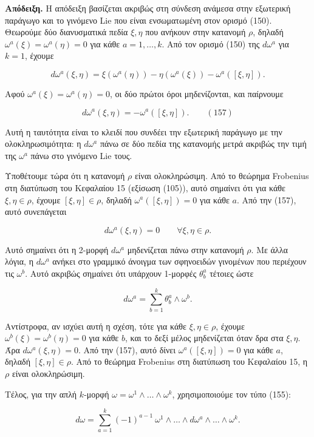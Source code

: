 \documentclass[12pt]{article}
\begin{document}
\textbf{Απόδειξη.} Η απόδειξη βασίζεται ακριβώς στη σύνδεση ανάμεσα στην εξωτερική παράγωγο και το γινόμενο Lie που είναι ενσωματωμένη στον ορισμό (150). Θεωρούμε δύο διανυσματικά πεδία $\xi, \eta$ που ανήκουν στην κατανομή $\rho$, δηλαδή $\omega^a(\xi) = \omega^a(\eta) = 0$ για κάθε $a = 1, \dots, k$. Από τον ορισμό (150) της $d\omega^a$ για $k=1$, έχουμε

\[
d\omega^a(\xi, \eta) = \xi(\omega^a(\eta)) - \eta(\omega^a(\xi)) - \omega^a([\xi, \eta]).
\]

Αφού $\omega^a(\xi) = \omega^a(\eta) = 0$, οι δύο πρώτοι όροι μηδενίζονται, και παίρνουμε

\[
d\omega^a(\xi, \eta) = -\omega^a([\xi, \eta]). \qquad (157)
\]

Αυτή η ταυτότητα είναι το κλειδί που συνδέει την εξωτερική παράγωγο με την ολοκληρωσιμότητα: η $d\omega^a$ πάνω σε δύο πεδία της κατανομής μετρά ακριβώς την τιμή της $\omega^a$ πάνω στο γινόμενο Lie τους.

Υποθέτουμε τώρα ότι η κατανομή $\rho$ είναι ολοκληρώσιμη. Από το θεώρημα Frobenius στη διατύπωση του Κεφαλαίου 15 (εξίσωση (105)), αυτό σημαίνει ότι για κάθε $\xi, \eta \in \rho$, έχουμε $[\xi, \eta] \in \rho$, δηλαδή $\omega^a([\xi, \eta]) = 0$ για κάθε $a$. Από την (157), αυτό συνεπάγεται

\[
d\omega^a(\xi, \eta) = 0 \qquad \forall \xi, \eta \in \rho.
\]

Αυτό σημαίνει ότι η 2-μορφή $d\omega^a$ μηδενίζεται πάνω στην κατανομή $\rho$. Με άλλα λόγια, η $d\omega^a$ ανήκει στο γραμμικό άνοιγμα των σφηνοειδών γινομένων που περιέχουν τις $\omega^b$. Αυτό ακριβώς σημαίνει ότι υπάρχουν 1-μορφές $\theta^a_b$ τέτοιες ώστε

\[
d\omega^a = \sum_{b=1}^{k} \theta^a_b \wedge \omega^b.
\]

Αντίστροφα, αν ισχύει αυτή η σχέση, τότε για κάθε $\xi, \eta \in \rho$, έχουμε $\omega^b(\xi) = \omega^b(\eta) = 0$ για κάθε $b$, και το δεξί μέλος μηδενίζεται όταν δρα στα $\xi, \eta$. Άρα $d\omega^a(\xi, \eta) = 0$. Από την (157), αυτό δίνει $\omega^a([\xi, \eta]) = 0$ για κάθε $a$, δηλαδή $[\xi, \eta] \in \rho$. Από το θεώρημα Frobenius στη διατύπωση του Κεφαλαίου 15, η $\rho$ είναι ολοκληρώσιμη.

Τέλος, για την απλή $k$-μορφή $\omega = \omega^1 \wedge \dots \wedge \omega^k$, χρησιμοποιούμε τον τύπο (155):

\[
d\omega = \sum_{a=1}^{k} (-1)^{a-1} \ \omega^1 \wedge \dots \wedge d\omega^a \wedge \dots \wedge \omega^k.
\]
\end{document}
